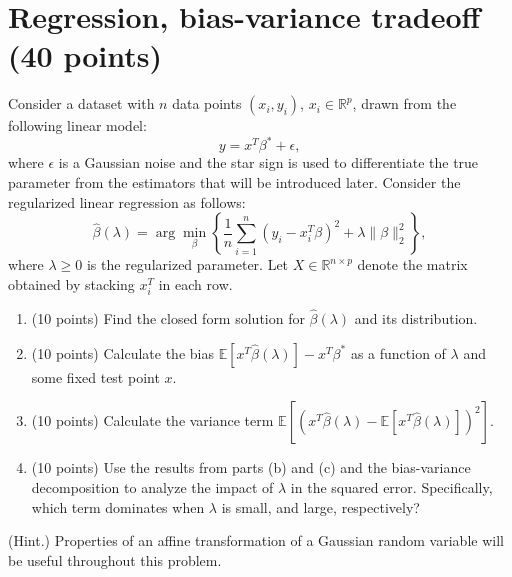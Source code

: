 \documentclass[twoside,10pt]{article}
\begin{document}
\section{Regression, bias-variance tradeoff (40 points)} 


Consider a dataset with $n$ data points $(x_i, y_i)$, $x_i \in \mathbb R^p$, drawn from the following linear model:
\[
y = x^T {\beta^*} + \epsilon,
\]
where $\epsilon$ is a Gaussian noise and the star sign is used to differentiate the true parameter from the estimators that will be introduced later. Consider the regularized linear regression as follows:
\[
\hat \beta(\lambda) 
= \arg\min_{\beta}
\left\{
\frac 1 n \sum_{i=1}^n (y_i -x_i^T \beta)^2 + \lambda \|\beta\|_2^2
\right\},
\]
where $\lambda \geq 0$ is the regularized parameter. Let $X\in \mathbb R^{n\times p}$ denote the matrix obtained by stacking $x_i^T$ in each row. 
\begin{enumerate}
\item (10 points) Find the closed form solution for $\hat \beta(\lambda)$ and its distribution.
\item (10 points) Calculate the bias  $\mathbb E[x^T {\hat \beta}(\lambda)] - x^T {\beta^*}$ as a function of $\lambda$ and some fixed test point $x$.
\item (10 points) Calculate the variance term $\mathbb E\left[\left(x^T {\hat \beta}(\lambda) - \mathbb E[x^T {\hat \beta}(\lambda)] \right)^2\right]$.
\item (10 points) Use the results from parts (b) and (c) and the bias-variance decomposition to analyze the impact of $\lambda$ in the squared error. Specifically, which term dominates when $\lambda$ is small, and large, respectively?
\end{enumerate}


(Hint.) Properties of an affine transformation of a Gaussian random variable will be useful throughout this problem.
\end{document}
